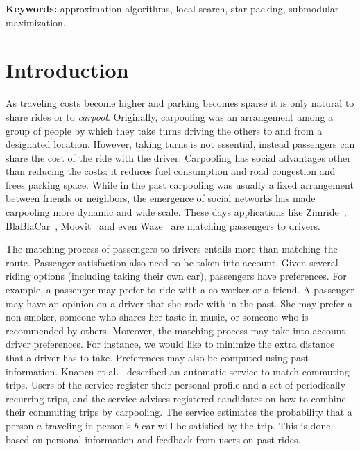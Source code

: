 \documentclass[11pt]{article}
\begin{document}
\begin{titlepage}

\medskip
\noindent
\textbf{Keywords:} approximation algorithms, local search, star
packing, submodular maximization.


\thispagestyle{empty}
\end{titlepage}


\section{Introduction}

As traveling costs become higher and parking becomes sparse it is only
natural to share rides or to \emph{carpool}.  Originally, carpooling
was an arrangement among a group of people by which they take turns
driving the others to and from a designated location.  However, taking
turns is not essential, instead passengers can share the cost of the
ride with the driver.  Carpooling has social advantages other than
reducing the costs: it reduces fuel consumption and road congestion
and frees parking space.  
%
While in the past carpooling was usually a fixed arrangement between
friends or neighbors, the emergence of social networks has made
carpooling more dynamic and wide scale.  These days applications like
Zimride~\cite{zimride}, BlaBlaCar~\cite{blablacar},
Moovit~\cite{moovit} and even Waze~\cite{waze} are matching passengers
to drivers.

The matching process of passengers to drivers entails more than
matching the route.
%
Passenger satisfaction also need to be taken into account.  Given
several riding options (including taking their own car), passengers
have preferences.  For example, a passenger may prefer to ride with a
co-worker or a friend.  A passenger may have an opinion on a driver
that she rode with in the past.  She may prefer a non-smoker, someone
who shares her taste in music, or someone who is recommended by
others.
%
Moreover, the matching process may take into account driver
preferences.  For instance, we would like to minimize the extra
distance that a driver has to take.
%
Preferences may also be computed using past information.  Knapen et
al.~\cite{knapen2013estimating} described an automatic service to
match commuting trips.  Users of the service register their personal
profile and a set of periodically recurring trips, and the service
advises registered candidates on how to combine their commuting trips
by carpooling.  The service estimates the probability that a person
$a$ traveling in person's $b$ car will be satisfied by the trip.  This
is done based on personal information and feedback from users on past
rides.
\end{document}
